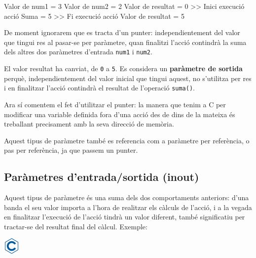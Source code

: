 \documentclass[]{book}
\newenvironment{Shaded}{\begin{snugshade}}{\end{snugshade}}
\newcommand{\DecValTok}[1]{\textcolor[rgb]{0.00,0.00,0.81}{#1}}
\newcommand{\NormalTok}[1]{#1}
\begin{document}
\begin{Shaded}
\begin{Highlighting}[]
\NormalTok{Valor de num1 = }\DecValTok{3}
\NormalTok{Valor de num2 = }\DecValTok{2}
\NormalTok{Valor de resultat = }\DecValTok{0}
\NormalTok{\textgreater{}\textgreater{} Inici execució acció}
\NormalTok{Suma = }\DecValTok{5}
\NormalTok{\textgreater{}\textgreater{} Fi execució acció}
\NormalTok{Valor de resultat = }\DecValTok{5}
\end{Highlighting}
\end{Shaded}

De moment ignorarem que es tracta d'un punter: independientement del valor que tingui res al pasar-se per paràmetre, quan finalitzi l'acció contindrà la suma dels altres dos paràmetres d'entrada \texttt{num1} i \texttt{num2}.

El valor resultat ha canviat, de \texttt{0} a \texttt{5}. Es considera un \textbf{paràmetre de sortida} perquè, independientement del valor inicial que tingui aquest, no s'utilitza per res i en finalitzar l'acció contindrà el resultat de l'operació \texttt{suma()}.

Ara sí comentem el fet d'utilitzar el punter: la manera que tenim a C per modificar una variable definida fora d'una acció des de dins de la mateixa és treballant precisament amb la seva direcció de memòria.

Aquest tipus de paràmetre també es referencia com a paràmetre per referència, o pas per referència, ja que passem un punter.

\hypertarget{parametres-dentradasortida-inout}{%
\subsection{Paràmetres d'entrada/sortida (inout)}\label{parametres-dentradasortida-inout}}

Aquest tipus de paràmetre és una suma dels dos comportaments anteriors: d'una banda el seu valor importa a l'hora de realitzar els càlculs de l'acció, i a la vegada en finalitzar l'execució de l'acció tindrà un valor diferent, també significatiu per tractar-se del resultat final del càlcul. Exemple:

\includegraphics{./img/c.png}
\end{document}

